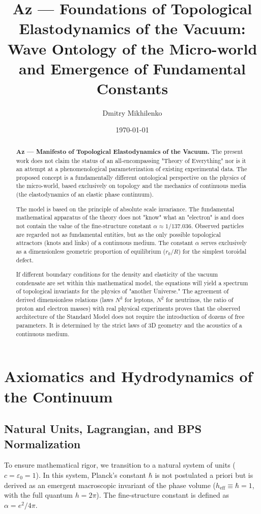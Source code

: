 \documentclass[11pt,a4paper]{article}
\title{\textbf{Az — Foundations of Topological Elastodynamics of the Vacuum:\\ Wave Ontology of the Micro-world and Emergence of Fundamental Constants}}
\author{Dmitry Mikhilenko}
\date{\today}
\begin{document}
	
	\maketitle

\begin{abstract}
\textbf{Az — Manifesto of Topological Elastodynamics of the Vacuum.} 
The present work does not claim the status of an all-encompassing "Theory of Everything" nor is it an attempt at a phenomenological parameterization of existing experimental data. The proposed concept is a fundamentally different ontological perspective on the physics of the micro-world, based exclusively on topology and the mechanics of continuous media (the elastodynamics of an elastic phase continuum).

The model is based on the principle of absolute scale invariance. The fundamental mathematical apparatus of the theory does not "know" what an "electron" is and does not contain the value of the fine-structure constant $\alpha \approx 1/137.036$. Observed particles are regarded not as fundamental entities, but as the only possible topological attractors (knots and links) of a continuous medium. The constant $\alpha$ serves exclusively as a dimensionless geometric proportion of equilibrium ($r_0/R$) for the simplest toroidal defect.

If different boundary conditions for the density and elasticity of the vacuum condensate are set within this mathematical model, the equations will yield a spectrum of topological invariants for the physics of "another Universe." The agreement of derived dimensionless relations (laws $N^3$ for leptons, $N^2$ for neutrinos, the ratio of proton and electron masses) with real physical experiments proves that the observed architecture of the Standard Model does not require the introduction of dozens of free parameters. It is determined by the strict laws of 3D geometry and the acoustics of a continuous medium.
\end{abstract}

\section{Axiomatics and Hydrodynamics of the Continuum}

\subsection{Natural Units, Lagrangian, and BPS Normalization}
To ensure mathematical rigor, we transition to a natural system of units ($c = \varepsilon_0 = 1$). In this system, Planck's constant $\hbar$ is not postulated a priori but is derived as an emergent macroscopic invariant of the phase volume ($h_{\text{eff}} \equiv \hbar = 1$, with the full quantum $h = 2\pi$). The fine-structure constant is defined as $\alpha = e^2 / 4\pi$.
\end{document}
